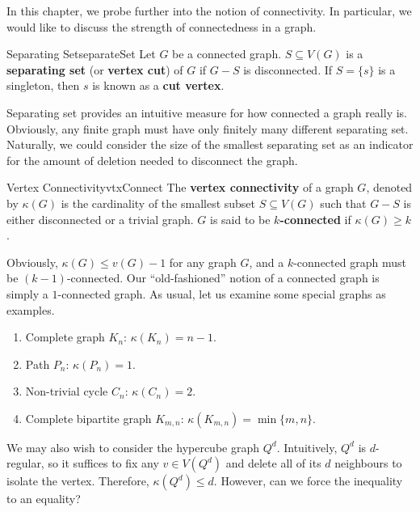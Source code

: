 \documentclass[math, code]{amznotes}
\theoremstyle{remark}
\begin{document}
In this chapter, we probe further into the notion of connectivity. In particular, we would like to discuss the strength of connectedness in a graph.
\begin{dfnbox}{Separating Set}{separateSet}
    Let $G$ be a connected graph. $S \subseteq V(G)$ is a {\color{red} \textbf{separating set}} (or {\color{red} \textbf{vertex cut}}) of $G$ if $G - S$ is disconnected. If $S = \{s\}$ is a singleton, then $s$ is known as a {\color{red} \textbf{cut vertex}}.
\end{dfnbox}
Separating set provides an intuitive measure for how connected a graph really is. Obviously, any finite graph must have only finitely many different separating set. Naturally, we could consider the size of the smallest separating set as an indicator for the amount of deletion needed to disconnect the graph.
\begin{dfnbox}{Vertex Connectivity}{vtxConnect}
    The {\color{red} \textbf{vertex connectivity}} of a graph $G$, denoted by $\kappa(G)$ is the cardinality of the smallest subset $S \subseteq V(G)$ such that $G - S$ is either disconnected or a trivial graph. $G$ is said to be {\color{red} \textbf{$k$-connected}} if $\kappa(G) \geq k$.
\end{dfnbox}
Obviously, $\kappa(G) \leq v(G) - 1$ for any graph $G$, and a $k$-connected graph must be $(k - 1)$-connected. Our ``old-fashioned'' notion of a connected graph is simply a $1$-connected graph. As usual, let us examine some special graphs as examples.
\begin{enumerate}
    \item Complete graph $K_n$: $\kappa(K_n) = n - 1$.
    \item Path $P_n$: $\kappa(P_n) = 1$.
    \item Non-trivial cycle $C_n$: $\kappa(C_n) = 2$.
    \item Complete bipartite graph $K_{m, n}$: $\kappa(K_{m, n}) = \min\{m, n\}$.
\end{enumerate}
We may also wish to consider the hypercube graph $Q^d$. Intuitively, $Q^d$ is $d$-regular, so it suffices to fix any $v \in V\left(Q^d\right)$ and delete all of its $d$ neighbours to isolate the vertex. Therefore, $\kappa\left(Q^d\right) \leq d$. However, can we force the inequality to an equality?
\end{document}
